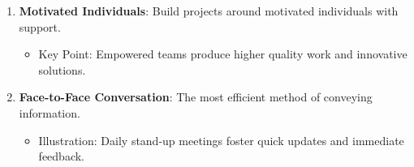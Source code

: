 \documentclass{beamer}
\begin{document}
\begin{frame}[fragile]
\begin{enumerate}
\begin{itemize}
            \end{itemize}
        \item \textbf{Motivated Individuals}: Build projects around motivated individuals with support.
            \begin{itemize}
                \item Key Point: Empowered teams produce higher quality work and innovative solutions.
            \end{itemize}
        \item \textbf{Face-to-Face Conversation}: The most efficient method of conveying information.
            \begin{itemize}
                \item Illustration: Daily stand-up meetings foster quick updates and immediate feedback.
            \end{itemize}
    \end{enumerate}
\end{frame}
\end{document}
